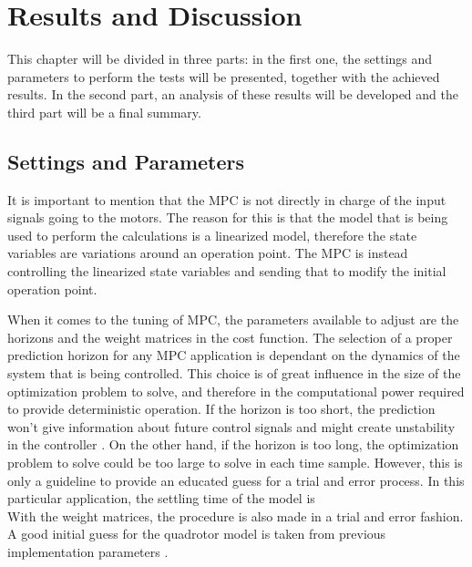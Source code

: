\chapter{Results and Discussion}
\label{chap:Results_and_Discussion}

This chapter will be divided in three parts: in the first one, the settings and parameters to perform the tests will be presented, together with the achieved results. In the second part, an analysis of these results will be developed and the third part will be a final summary.

\section{Settings and Parameters}

It is important to mention that the MPC is not directly in charge of the input signals going to the motors. The reason for this is that the model that is being used to perform the calculations is a linearized model, therefore the state variables are variations around an operation point. The MPC is instead controlling the linearized state variables and sending that to modify the initial operation point.

When it comes to the tuning of MPC, the parameters available to adjust are the horizons and the weight matrices in the cost function. The selection of a proper prediction horizon for any MPC application is dependant on the dynamics of the system that is being controlled.  This choice is of great influence in the size of the optimization problem to solve, and therefore in the computational power required to provide deterministic operation. If the horizon is too short, the prediction won't give information about future control signals and might create unstability in the controller \cite{ref:Gabrielsson2012}. On the other hand, if the horizon is too long, the optimization problem to solve could be too large to solve in each time sample. However, this is only a guideline to provide an educated guess for a trial and error process. In this particular application, the settling time of the model is \\

With the weight matrices, the procedure is also made in a trial and error fashion. A good initial guess for the quadrotor model is taken from previous implementation parameters \cite{ref:Bouffard2012}.

